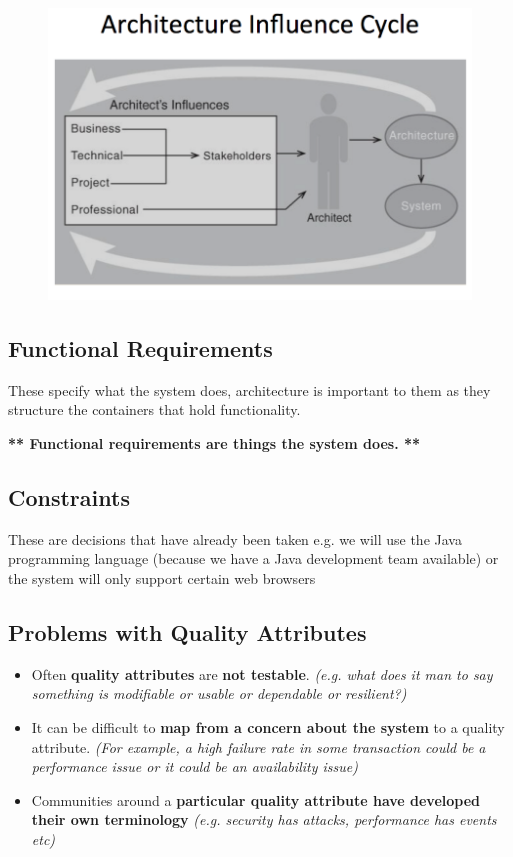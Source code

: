 \documentclass[a4paper]{article}
\begin{document}
\begin{figure}[h]
\centering 
\includegraphics[scale=0.3]{images/influencecycle.png}
\end{figure}

\subsection{Functional Requirements}
These specify what the system does, architecture is important to them as they structure the containers that hold functionality. 

\textbf{** Functional requirements are things the system does. **}

\subsection{Constraints}
These are decisions that have already been taken e.g. we will use the Java programming language (because we have a Java development team available) or the system will only support certain web browsers


\subsection{Problems with Quality Attributes}
\begin{itemize}
\item Often \textbf{quality attributes} are \textbf{not testable}. \textit{(e.g. what does it man to say something is modifiable or usable or dependable or resilient?)}

\item It can be difficult to \textbf{map from a concern about the system} to a quality attribute. \textit{(For example, a high failure rate in some transaction could be a performance issue or it could be an availability issue)}

\item Communities around a \textbf{particular quality attribute have developed their own terminology} \textit{(e.g. security has attacks, performance has events etc)}
\end{itemize}
\end{document}
